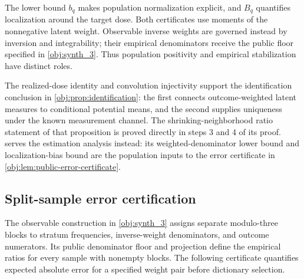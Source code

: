 \documentclass[11pt]{article}
\begin{document}
The lower bound \(b_q\) makes population normalization explicit, and \(B_q\) quantifies localization around the target dose. Both certificates use moments of the nonnegative latent weight. Observable inverse weights are governed instead by inversion and integrability; their empirical denominators receive the public floor specified in \cref{obj:synth_3}. Thus population positivity and empirical stabilization have distinct roles.

The realized-dose identity and convolution injectivity support the identification conclusion in \cref{obj:prop:identification}: the first connects outcome-weighted latent measures to conditional potential means, and the second supplies uniqueness under the known measurement channel. The shrinking-neighborhood ratio statement of that proposition is proved directly in steps 3 and 4 of its proof.  serves the estimation analysis instead: its weighted-denominator lower bound and localization-bias bound are the population inputs to the error certificate in \cref{obj:lem:public-error-certificate}.

\subsection{Split-sample error certification}

The observable construction in \cref{obj:synth_3} assigns separate modulo-three blocks to stratum frequencies, inverse-weight denominators, and outcome numerators. Its public denominator floor and projection define the empirical ratios for every sample with nonempty blocks. The following certificate quantifies expected absolute error for a specified weight pair before dictionary selection.
\end{document}
